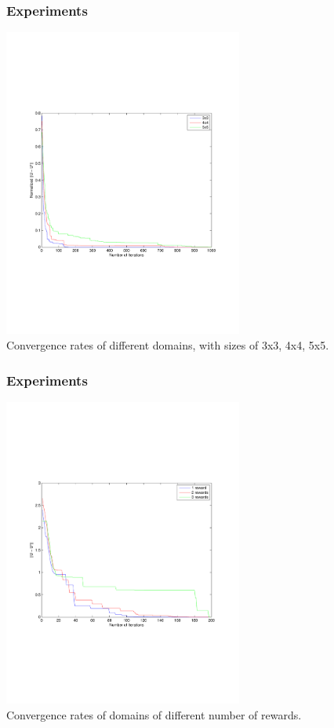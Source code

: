 \documentclass{beamer}
\begin{document}
\begin{frame}
\begin{figure}[h!]
\frametitle{Experiments}
\includegraphics[width=0.7\textwidth]{exp0.pdf}
\caption{Convergence rates of different domains, with sizes of 3x3, 4x4, 5x5.}
\label{fig:exp}
\end{figure}
\end{frame}

\begin{frame}
\begin{figure}[h!]
\frametitle{Experiments}
\includegraphics[width=0.7\textwidth]{experiment.pdf}
\caption{Convergence rates of domains of different number of rewards.}
\label{fig:exp}
\end{figure}
\end{frame}
\end{document}

